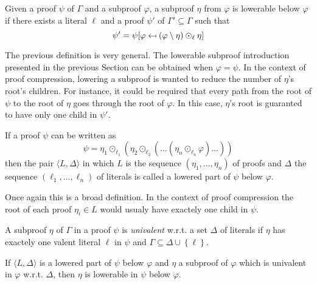 \documentclass{llncs}
\begin{document}
\begin{definition}
Given a proof $\psi$ of $\Gamma$ and a subproof $\varphi$, a subproof $\eta$ from $\varphi$ is lowerable
below $\varphi$ if there exists a literal $\ell$ and a proof $\psi'$ of $\Gamma' \subseteq
\Gamma$ such that
\begin{equation}
  \psi' = \psi[\varphi \mapsfrom \left(\varphi \setminus \eta\right) \odot_\ell \eta]
\end{equation}
\end{definition}
The previous definition is very general. The lowerable subproof introduction presented in the
previous Section can be obtained when $\varphi = \psi$. In the context of proof compression,
lowering a subproof is wanted to reduce the number of $\eta$'s root's children. For instance, it
could be required that every path from the root of $\psi$ to the root of $\eta$ goes through the
root of $\varphi$. In this case, $\eta$'s root is guaranted to have only one child in $\psi'$.

\begin{definition}
If a proof $\psi$ can be written as
\begin{equation}
  \psi = \eta_1 \odot_{\ell_1} ( \eta_2 \odot_{\ell_2} ( \ldots (\eta_n \odot_{\ell_n} \varphi)
          \ldots ))
\end{equation}
then the pair $\langle L,\Delta \rangle$ in which $L$ is the sequence $(\eta_1,\ldots,\eta_n)$ of
proofs and $\Delta$ the sequence $(\ell_1,\ldots,\ell_n)$ of literals is called a lowered part of
$\psi$ below $\varphi$.
\end{definition}
Once again this is a broad definition. In the context of proof compression the root of each proof
$\eta_i \in L$ would usualy have exactely one child in $\psi$.

\begin{definition}
A subproof $\eta$ of $\Gamma$ in a proof $\psi$ is \emph{univalent} w.r.t. a set $\Delta$ of literals if $\eta$ has
exactely one valent literal $\ell$ in $\psi$ and $\Gamma \subseteq \Delta \cup \left\{ \ell
\right\}$.
\end{definition}

\begin{proposition}
If $\langle L,\Delta \rangle$ is a lowered part of $\psi$ below $\varphi$ and $\eta$ a subproof of
$\varphi$ which is univalent in $\varphi$ w.r.t. $\Delta$, then $\eta$ is lowerable in $\psi$ below $\varphi$.
\end{proposition}
\end{document}
